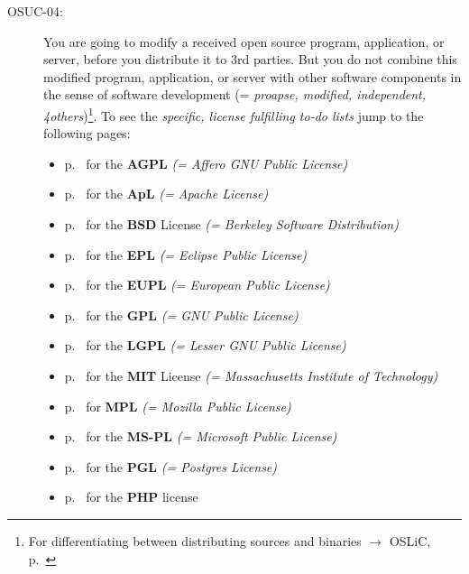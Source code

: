 \begin{description}
\item[OSUC-04:]\label{OSUC-04-DEF} You are going to modify a received open
source program, application, or server, before you distribute it to 3rd parties.
But you do not combine this modified program, application, or server with other
software components in the sense of software development (= \textit{proapse,
modified, independent, 4others})\footnote{For differentiating between
distributing sources and binaries $\rightarrow$ OSLiC, p.\
\pageref{sec:SourceBinaryDifference}}.
To see the \textit{specific, license fulfilling to-do lists} jump to the
following pages:
  \begin{itemize}
    \item p.\ \pageref{OSUC-04-AGPL} for the \textbf{AGPL}
      \textit{(= Affero GNU Public License)} 
    \item p.\ \pageref{OSUC-04-Apache20} for the \textbf{ApL}
      \textit{(= Apache License)}
    \item p.\ \pageref{OSUC-04-BSD} for the \textbf{BSD} License
      \textit{(= Berkeley Software Distribution)}
    \item p.\ \pageref{OSUC-04-EPL} for the \textbf{EPL}
      \textit{(= Eclipse Public License)}     
    \item p.\ \pageref{OSUC-04-EUPL} for the \textbf{EUPL}
      \textit{(= European Public License)} 
    \item p.\ \pageref{OSUC-04-GPL} for the \textbf{GPL}
       \textit{(= GNU Public License)} 
    \item p.\ \pageref{OSUC-04-LGPL} for the \textbf{LGPL}
      \textit{(= Lesser GNU Public License)}           
    \item p.\ \pageref{OSUC-04-MIT} for the \textbf{MIT} License
       \textit{(= Massachusetts Institute of Technology)} 
    \item p.\ \pageref{OSUC-04-MPL} for \textbf{MPL}
      \textit{(= Mozilla Public License)}     
    \item p.\ \pageref{OSUC-04-MS-PL} for the \textbf{MS-PL}
      \textit{(= Microsoft Public License)} 
    \item p.\ \pageref{OSUC-04-PGL} for the \textbf{PGL}
      \textit{(= Postgres License)} 
    \item p.\ \pageref{OSUC-04-PHP} for the \textbf{PHP} license 
  \end{itemize}


\end{description}
